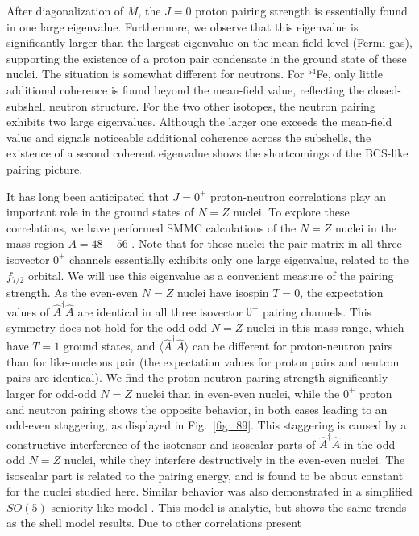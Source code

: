 \documentclass[rmp,aps,floatfix]{revtex4}
\begin{document}
After diagonalization of $M$, the $J=0$
proton pairing strength is essentially found
in one large eigenvalue. Furthermore, we observe that this eigenvalue is
significantly larger than the largest eigenvalue on the mean-field level
(Fermi gas), supporting the existence of a proton pair condensate in the
ground state of these nuclei.
The situation is somewhat different for neutrons.
For $^{54}$Fe, only little additional coherence is found beyond the
mean-field value, reflecting the closed-subshell neutron structure.
For the two other isotopes, the neutron pairing exhibits
two large eigenvalues. Although the larger one exceeds the mean-field
value and signals noticeable additional coherence across the subshells,
the existence of a second coherent eigenvalue shows the shortcomings of the
BCS-like pairing picture.


It has long been anticipated that $J=0^+$ proton-neutron correlations
play an important role in the ground states of $N=Z$ nuclei. To explore
these correlations, we have performed SMMC calculations of the $N=Z$ nuclei
in the mass region $A=48-56$ \cite{langanke97}. 
Note that for these nuclei the pair matrix
in all three isovector $0^+$ channels
essentially exhibits only one large eigenvalue, related to the
$f_{7/2}$ orbital. We will use this eigenvalue as a convenient measure of the
pairing strength. As the even-even $N=Z$ nuclei have isospin $T=0$,
the expectation values of ${\hat A}^\dagger {\hat A}$
are identical in all three isovector
$0^+$ pairing channels. This symmetry does not hold for the odd-odd $N=Z$
nuclei in this mass range, which have $T=1$ ground states, and
$\langle \hat{A}^\dagger \hat{A} \rangle$
can be different for proton-neutron pairs
than for like-nucleons pair (the expectation values for proton pairs
and neutron
pairs are identical). We find the proton-neutron pairing strength
significantly larger for odd-odd $N=Z$ nuclei than in even-even nuclei,
while the $0^+$ proton and neutron pairing shows the opposite behavior,
in both cases leading to an odd-even staggering, as displayed in
Fig.~\ref{fig_89}. This staggering is caused by a constructive interference
of the isotensor and isoscalar parts of $\hat{A}^\dagger \hat{A}$
in the odd-odd
$N=Z$ nuclei, while they interfere destructively in the even-even nuclei.
The isoscalar part is related to
the pairing energy, and is found to be about constant for the nuclei
studied here. Similar behavior was also demonstrated in a simplified $SO(5)$
seniority-like model \cite{engel96,engel1998}. This model is analytic, but shows the
same trends as the shell model results. Due to other correlations present
\end{document}
